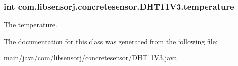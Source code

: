 \subsubsection[{temperature}]{\setlength{\rightskip}{0pt plus 5cm}int com.\+libsensorj.\+concretesensor.\+D\+H\+T11\+V3.\+temperature\hspace{0.3cm}{\ttfamily [private]}}\label{classcom_1_1libsensorj_1_1concretesensor_1_1DHT11V3_a0c34b9cc559817c10910b1a6180decfd}
The temperature. 

The documentation for this class was generated from the following file\+:\begin{DoxyCompactItemize}
\item 
main/java/com/libsensorj/concretesensor/\hyperlink{DHT11V3_8java}{D\+H\+T11\+V3.\+java}\end{DoxyCompactItemize}
